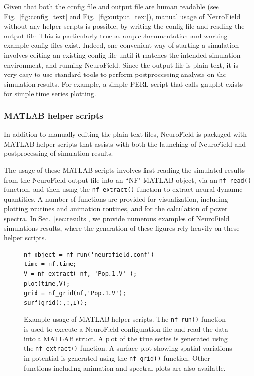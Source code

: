 \documentclass[preprint,review,10pt,authoryear,letterpaper]{elsarticle}
\begin{document}
Given that both the config file and output file are human readable (see Fig.~\ref{fig:config_text} and Fig.~\ref{fig:output_text}), manual usage of NeuroField without any helper scripts is possible, by writing the config file and reading the output file. This is particularly true as ample documentation and working example config files exist. Indeed, one convenient way of starting a simulation involves editing an existing config file until it matches the intended simulation environment, and running NeuroField. Since the output file is plain-text, it is very easy to use standard tools to perform postprocessing analysis on the simulation results. For example, a simple PERL script that calls gnuplot exists for simple time series plotting.

\subsubsection{MATLAB helper scripts}
\label{sec:postprocess-matlab}

In addition to manually editing the plain-text files, NeuroField is packaged with MATLAB helper scripts that assists with both the launching of NeuroField and postprocessing of simulation results.

The usage of these MATLAB scripts involves first reading the simulated results from the NeuroField output file into an ``NF" MATLAB object, via an {\tt nf\_read()} function, and then using the {\tt nf\_extract()} function to extract neural dynamic quantities. A number of functions are provided for visualization, including plotting routines and animation routines, and for the calculation of power spectra. In Sec.~\ref{sec:results}, we provide numerous examples of NeuroField simulations results, where the generation of these figures rely heavily on these helper scripts.


\begin{figure}[th]
\begin{center}
\begin{lstlisting}[style=Matlab-editor]
nf_object = nf_run('neurofield.conf')
time = nf.time;
V = nf_extract( nf, 'Pop.1.V' );
plot(time,V);
grid = nf_grid(nf,'Pop.1.V');
surf(grid(:,:,1));
\end{lstlisting}
\caption{Example usage of MATLAB helper scripts. The {\tt nf\_run()} function is used to execute a NeuroField configuration file and read the data into a MATLAB struct.  A plot of the time series is generated using the {\tt nf\_extract()} function. A surface plot showing spatial variations in potential is generated using the {\tt nf\_grid()} function.  Other functions including animation and spectral plots are also available.}
\label{fig:matlab_eg}
\end{center}
\end{figure}
\end{document}
